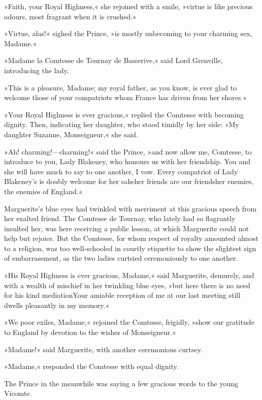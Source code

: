 »Faith, your Royal Highness,« she rejoined with a smile, »virtue is like precious odours, most fragrant when it is crushed.«

»Virtue, alas!« sighed the Prince, »is mostly unbecoming to your charming sex, Madame.«

»Madame la Comtesse de Tournay de Basserive,« said Lord Grenville, introducing the lady.

»This is a pleasure, Madame; my royal father, as you know, is ever glad to welcome those of your compatriots whom France has driven from her shores.«

»Your Royal Highness is ever gracious,« replied the Comtesse with becoming dignity. Then, indicating her daughter, who stood timidly by her side: »My daughter Suzanne, Monseigneur,« she said.

»Ah! charming!—charming!« said the Prince, »and now allow me, Comtesse, to introduce to you, Lady Blakeney, who honours us with her friendship. You and she will have much to say to one another, I vow. Every compatriot of Lady Blakeney's is doubly welcome for her sake\textellipsis \allowbreak  her friends are our friends\textellipsis \allowbreak  her enemies, the enemies of England.«

Marguerite's blue eyes had twinkled with merriment at this gracious speech from her exalted friend. The Comtesse de Tournay, who lately had so flagrantly insulted her, was here receiving a public lesson, at which Marguerite could not help but rejoice. But the Comtesse, for whom respect of royalty amounted almost to a religion, was too well-schooled in courtly etiquette to show the slightest sign of embarrassment, as the two ladies curtsied ceremoniously to one another.

»His Royal Highness is ever gracious, Madame,« said Marguerite, demurely, and with a wealth of mischief in her twinkling blue eyes, »but here there is no need for his kind mediation\textellipsis \allowbreak  Your amiable reception of me at our last meeting still dwells pleasantly in my memory.«

»We poor exiles, Madame,« rejoined the Comtesse, frigidly, »show our gratitude to England by devotion to the wishes of Monseigneur.«

»Madame!« said Marguerite, with another ceremonious curtsey.

»Madame,« responded the Comtesse with equal dignity.

The Prince in the meanwhile was saying a few gracious words to the young Vicomte.


